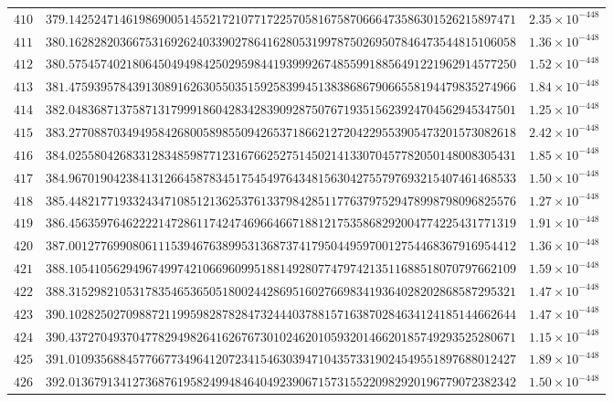 \documentclass[12pt,reqno]{amsart}
\theoremstyle{remark}
\begin{document}
\begin{longtable}{clc}
$410$ & $379.1425247146198690051455217210771722570581675870666473586301526215897471$ & $2.35\times 10^{-448}$ \\
$411$ & $380.1628282036675316926240339027864162805319978750269507846473544815106058$ & $1.36\times 10^{-448}$ \\
$412$ & $380.5754574021806450494984250295984419399926748559918856491221962914577250$ & $1.52\times 10^{-448}$ \\
$413$ & $381.4759395784391308916263055035159258399451383868679066558194479835274966$ & $1.84\times 10^{-448}$ \\
$414$ & $382.0483687137587131799918604283428390928750767193515623924704562945347501$ & $1.25\times 10^{-448}$ \\
$415$ & $383.2770887034949584268005898550942653718662127204229553905473201573082618$ & $2.42\times 10^{-448}$ \\
$416$ & $384.0255804268331283485987712316766252751450214133070457782050148008305431$ & $1.85\times 10^{-448}$ \\
$417$ & $384.9670190423841312664587834517545497643481563042755797693215407461468533$ & $1.50\times 10^{-448}$ \\
$418$ & $385.4482177193324347108512136253761337984285117763797529478998798096825576$ & $1.27\times 10^{-448}$ \\
$419$ & $386.4563597646222214728611742474696646671881217535868292004774225431771319$ & $1.91\times 10^{-448}$ \\
$420$ & $387.0012776990806111539467638995313687374179504495970012754468367916954412$ & $1.36\times 10^{-448}$ \\
$421$ & $388.1054105629496749974210669609951881492807747974213511688518070797662109$ & $1.59\times 10^{-448}$ \\
$422$ & $388.3152982105317835465365051800244286951602766983419364028202868587295321$ & $1.47\times 10^{-448}$ \\
$423$ & $390.1028250270988721199598287828473244403788157163870284634124185144662644$ & $1.47\times 10^{-448}$ \\
$424$ & $390.4372704937047782949826416267673010246201059320146620185749293525280671$ & $1.15\times 10^{-448}$ \\
$425$ & $391.0109356884577667734964120723415463039471043573319024549551897688012427$ & $1.89\times 10^{-448}$ \\
$426$ & $392.0136791341273687619582499484640492390671573155220982920196779072382342$ & $1.50\times 10^{-448}$ \\

\end{longtable}
\end{document}
